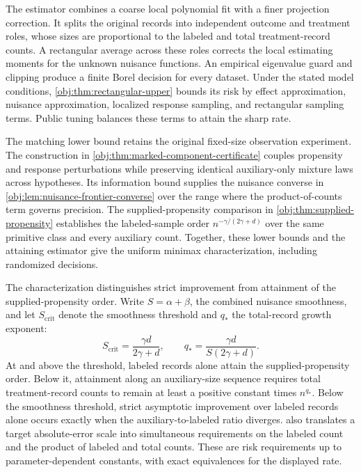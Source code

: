 \documentclass[11pt]{article}
\begin{document}
The estimator combines a coarse local polynomial fit with a finer projection correction. It splits the original records into independent outcome and treatment roles, whose sizes are proportional to the labeled and total treatment-record counts. A rectangular average across these roles corrects the local estimating moments for the unknown nuisance functions. An empirical eigenvalue guard and clipping produce a finite Borel decision for every dataset. Under the stated model conditions, \cref{obj:thm:rectangular-upper} bounds its risk by effect approximation, nuisance approximation, localized response sampling, and rectangular sampling terms. Public tuning balances these terms to attain the sharp rate.

The matching lower bound retains the original fixed-size observation experiment. The construction in \cref{obj:thm:marked-component-certificate} couples propensity and response perturbations while preserving identical auxiliary-only mixture laws across hypotheses. Its information bound supplies the nuisance converse in \cref{obj:lem:nuisance-frontier-converse} over the range where the product-of-counts term governs precision. The supplied-propensity comparison in \cref{obj:thm:supplied-propensity} establishes the labeled-sample order \(n^{-\gamma/(2\gamma+d)}\) over the same primitive class and every auxiliary count. Together, these lower bounds and the attaining estimator give the uniform minimax characterization, including randomized decisions.

The characterization distinguishes strict improvement from attainment of the supplied-propensity order. Write \(S=\alpha+\beta\), the combined nuisance smoothness, and let \(S_{\mathrm{crit}}\) denote the smoothness threshold and \(q_*\) the total-record growth exponent:
\[
S_{\mathrm{crit}}=\frac{\gamma d}{2\gamma+d},
\qquad
q_*=\frac{\gamma d}{S(2\gamma+d)}.
\]
At and above the threshold, labeled records alone attain the supplied-propensity order. Below it, attainment along an auxiliary-size sequence requires total treatment-record counts to remain at least a positive constant times \(n^{q_*}\). Below the smoothness threshold, strict asymptotic improvement over labeled records alone occurs exactly when the auxiliary-to-labeled ratio diverges.  also translates a target absolute-error scale into simultaneous requirements on the labeled count and the product of labeled and total counts. These are risk requirements up to parameter-dependent constants, with exact equivalences for the displayed rate.
\end{document}
